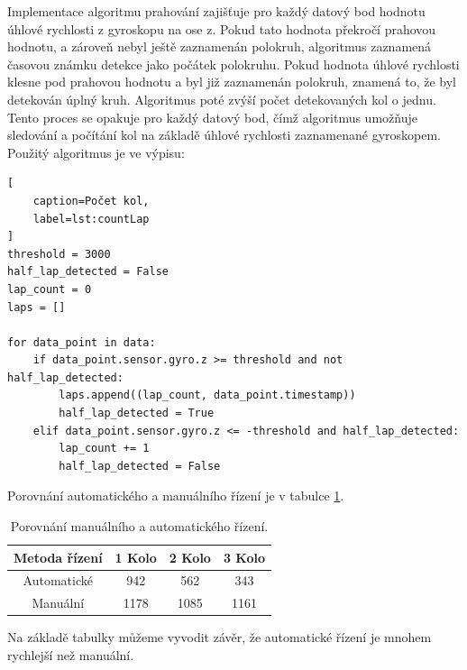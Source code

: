 Implementace algoritmu prahování zajišťuje pro každý datový bod hodnotu
úhlové rychlosti z gyroskopu na ose z. Pokud tato hodnota překročí prahovou hodnotu, a 
zároveň nebyl ještě zaznamenán polokruh, algoritmus zaznamená časovou známku detekce jako 
počátek polokruhu. Pokud hodnota úhlové rychlosti klesne pod prahovou hodnotu 
a byl již zaznamenán polokruh, znamená to, že byl detekován úplný kruh. 
Algoritmus poté zvýší počet detekovaných kol o jednu.
Tento proces se opakuje pro každý datový bod, čímž algoritmus umožňuje sledování a 
počítání kol na základě úhlové rychlosti zaznamenané gyroskopem.
Použitý algoritmus je ve výpisu:
\begin{lstlisting}[
	caption=Počet kol,
	label=lst:countLap
]
threshold = 3000
half_lap_detected = False
lap_count = 0
laps = []

for data_point in data:
    if data_point.sensor.gyro.z >= threshold and not half_lap_detected:
        laps.append((lap_count, data_point.timestamp))
        half_lap_detected = True
    elif data_point.sensor.gyro.z <= -threshold and half_lap_detected:
        lap_count += 1
        half_lap_detected = False
\end{lstlisting}

Porovnání automatického a manuálního řízení je v tabulce \ref{tab:Comparison}.
\begin{table}[!h]
    \centering
    \begin{tabular}{cccc}
        \hline
        \textbf{Metoda řízení} & \textbf{1 Kolo} & \textbf{2 Kolo} & \textbf{3 Kolo} \\
        \hline
        Automatické           & 942       & 562 & 343          \\
        Manuální 			  & 1178       & 1085 & 1161           \\
        \hline
    \end{tabular}
    \caption{Porovnání manuálního a automatického řízení.}
    \label{tab:Comparison}
\end{table}

Na základě tabulky můžeme vyvodit závěr, že automatické řízení
je mnohem rychlejší než manuální.
\endinput
